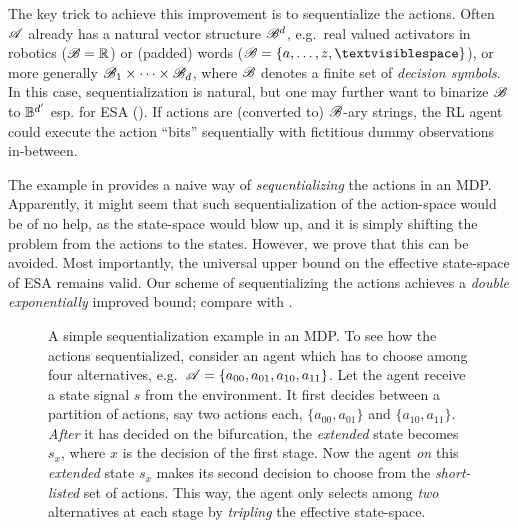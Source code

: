 \documentclass{article} %
\begin{document}
The key trick to achieve this improvement is to sequentialize the actions. Often $\mathscr{A}$ already has a natural vector structure $\mathscr{B}^d$, e.g.\ real valued activators in robotics ($\mathscr{B} = \mathbb{R}$) or (padded) words ($\B = \{a, \dots, z, \textvisiblespace\}$), or more generally $\mathscr{B}_1 \times \dots \times \mathscr{B}_d$, where $\mathscr{B}$ denotes a finite set of \emph{decision symbols}.
In this case, sequentialization is natural, but one may further want to binarize $\mathscr{B}$ to $\mathbb{B}^{d'}$ esp. for ESA ().
If actions are (converted to) $\mathscr{B}$-ary strings,
the RL agent could execute the action ``bits'' sequentially with fictitious dummy observations in-between.

The example in  provides a naive way of \emph{sequentializing} the actions in an MDP. Apparently, it might seem that such sequentialization of the action-space would be of no help, as the state-space would blow up, and it is simply shifting the problem from the actions to the states. However, we prove that this can be avoided. Most importantly, the universal upper bound on the effective state-space of ESA remains valid. Our scheme of sequentializing the actions achieves a \emph{double exponentially} improved bound; compare  with .

\begin{figure}[h]
   \centering
   \caption{A simple sequentialization example in an MDP. To see how the actions sequentialized, consider an agent which has to choose among four alternatives, e.g.\ $\mathscr{A} = \{a_{00}, a_{01}, a_{10}, a_{11}\}$. Let the agent receive a state signal $s$ from the environment. It first decides between a partition of actions, say two actions each, $\{a_{00}, a_{01}\}$ and $\{a_{10}, a_{11}\}$. \emph{After} it has decided on the bifurcation, the \emph{extended} state becomes $s_x$, where $x$ is the decision of the first stage. Now the agent \emph{on} this \emph{extended} state $s_x$ makes its second decision to choose from the \emph{short-listed} set of actions. This way, the agent only selects among \emph{two} alternatives at each stage by \emph{tripling} the effective state-space.}
   \label{fig:example}
\end{figure}
\end{document}
